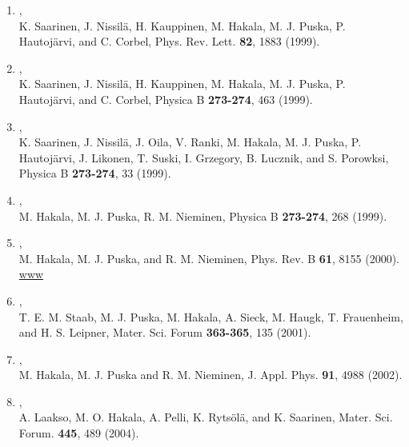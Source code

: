 \documentclass[12pt,a4]{report}
\begin{document}
\begin{enumerate}
\item {}, \\K. Saarinen, J. Nissil\"a, H. Kauppinen, M. Hakala,
M. J. Puska, P. Hautoj\"arvi, and C. Corbel, Phys. Rev. Lett. {\bf
82}, 1883 (1999).

\item {},\\ K. Saarinen, J. Nissil\"a, H. Kauppinen, M. Hakala,
M. J. Puska, P. Hautoj\"arvi, and C. Corbel,  Physica B {\bf
273-274}, 463 (1999). 

\item {},\\K. Saarinen, J. Nissil\"a, J. Oila, V. Ranki, M. Hakala,
M. J. Puska, P. Hautoj\"arvi, J. Likonen, T. Suski, I. Grzegory,
B. Lucznik, and S. Porowksi, Physica B
{\bf 273-274}, 33 (1999). 

\item {},\\ M. Hakala, M. J. Puska, R. M. Nieminen, Physica B {\bf
273-274}, 268 (1999).

\item {},\\ M. Hakala, M. J. Puska, and R. M. Nieminen, Phys. Rev. B
{\bf 61}, 8155 (2000).
\href{http://journals.aps.org/prb/abstract/10.1103/PhysRevB.61.8155}{www}

\item {},\\ T. E. M. Staab,
M. J. Puska, M. Hakala, A. Sieck, M. Haugk, T. Frauenheim, and
H. S. Leipner, Mater. Sci. Forum {\bf 363-365}, 135 (2001).

\item{},\\ M. Hakala,
M. J. Puska and R. M. Nieminen, J. Appl. Phys. {\bf 91}, 4988 (2002).

\item{},\\
A. Laakso, M. O. Hakala, A. Pelli, K. Ryts\"ol\"a, and K. Saarinen,
Mater. Sci. Forum. {\bf 445}, 489 (2004).


\end{enumerate}
\end{document}
